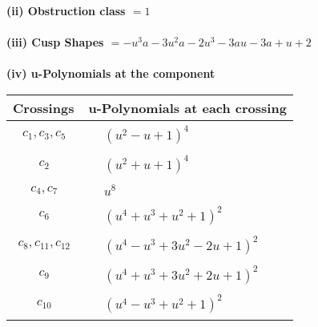 \documentclass[1p]{elsarticle_modified}
\theoremstyle{definition}
\begin{document}
\flushleft \textbf{(ii) Obstruction class $= 1$}\\~\\
\flushleft \textbf{(iii) Cusp Shapes $= - u^3 a-3 u^2 a-2 u^3-3 a u-3 a+u+2$}\\~\\
\newpage\renewcommand{\arraystretch}{1}
\flushleft \textbf{(iv) u-Polynomials at the component}\newline \\
\begin{tabular}{m{50pt}|m{274pt}}
Crossings & \hspace{64pt}u-Polynomials at each crossing \\
\hline $$\begin{aligned}c_{1},c_{3},c_{5}\end{aligned}$$&$\begin{aligned}
&(u^2- u+1)^4
\end{aligned}$\\
\hline $$\begin{aligned}c_{2}\end{aligned}$$&$\begin{aligned}
&(u^2+u+1)^4
\end{aligned}$\\
\hline $$\begin{aligned}c_{4},c_{7}\end{aligned}$$&$\begin{aligned}
&u^8
\end{aligned}$\\
\hline $$\begin{aligned}c_{6}\end{aligned}$$&$\begin{aligned}
&(u^4+u^3+u^2+1)^2
\end{aligned}$\\
\hline $$\begin{aligned}c_{8},c_{11},c_{12}\end{aligned}$$&$\begin{aligned}
&(u^4- u^3+3 u^2-2 u+1)^2
\end{aligned}$\\
\hline $$\begin{aligned}c_{9}\end{aligned}$$&$\begin{aligned}
&(u^4+u^3+3 u^2+2 u+1)^2
\end{aligned}$\\
\hline $$\begin{aligned}c_{10}\end{aligned}$$&$\begin{aligned}
&(u^4- u^3+u^2+1)^2
\end{aligned}$\\
\hline
\end{tabular}\\~\\
\end{document}
